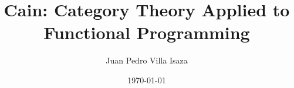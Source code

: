 \title{Cain: Category Theory Applied to Functional Programming}
\author{Juan Pedro Villa Isaza}
\date{\today}

\maketitle
